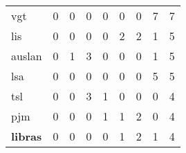 \begin{table}[ht!]
{\begin{tabular}{l|ccccccc|c}
            \acrshort{vgt}                                                                                        & 0                                                & 0                         & 0                          & 0                          & 0                          & 0                          & \cellcolor[HTML]{FFF5E1}7  & 7                                               \\
            \acrshort{lis}                                                                                        & 0                                                & 0                         & 0                          & 0                          & \cellcolor[HTML]{FFFCF6}2  & \cellcolor[HTML]{FFFCF6}2  & \cellcolor[HTML]{FFFEFB}1  & 5                                               \\
            \acrshort{auslan}                                                                                     & 0                                                & \cellcolor[HTML]{FFFEFB}1 & \cellcolor[HTML]{FFFBF2}3  & 0                          & 0                          & 0                          & \cellcolor[HTML]{FFFEFB}1  & 5                                               \\
            \acrshort{lsa}                                                                                        & 0                                                & 0                         & 0                          & 0                          & 0                          & 0                          & \cellcolor[HTML]{FFF8EA}5  & 5                                               \\
            \acrshort{tsl}                                                                                        & 0                                                & 0                         & \cellcolor[HTML]{FFFBF2}3  & \cellcolor[HTML]{FFFEFB}1  & 0                          & 0                          & 0                          & 4                                               \\
            \acrshort{pjm}                                                                                        & 0                                                & 0                         & 0                          & \cellcolor[HTML]{FFFEFB}1  & \cellcolor[HTML]{FFFEFB}1  & \cellcolor[HTML]{FFFCF6}2  & 0                          & 4                                               \\
            \textbf{\acrshort{libras}}                                                                            & 0                                                & 0                         & 0                          & 0                          & \cellcolor[HTML]{FFFEFB}1  & \cellcolor[HTML]{FFFCF6}2  & \cellcolor[HTML]{FFFEFB}1  & 4                                               \\

\end{tabular}}
\end{table}
